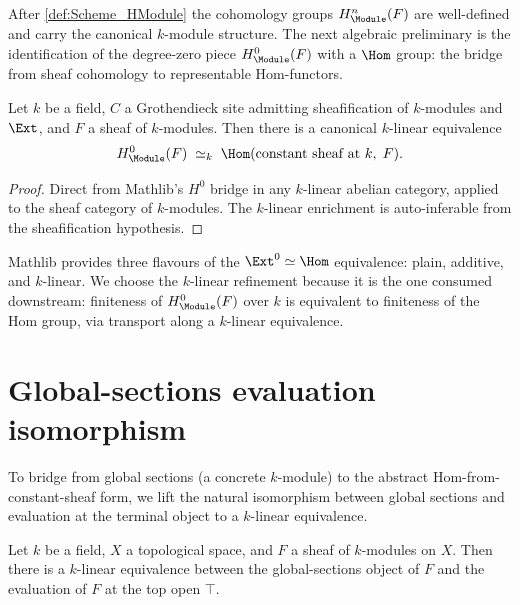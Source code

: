 After \cref{def:Scheme_HModule} the cohomology groups \(H^n_{\Module}(F)\) are well-defined and carry the canonical \(k\)-module structure. The next algebraic preliminary is the identification of the degree-zero piece \(H^0_{\Module}(F)\) with a \(\Hom\) group: the bridge from sheaf cohomology to representable Hom-functors.

\begin{definition}
  \label{def:Scheme_HModule_zero_linearEquiv}

  Let \(k\) be a field, \(C\) a Grothendieck site admitting sheafification of \(k\)-modules and \(\Ext\), and \(F\) a sheaf of \(k\)-modules. Then there is a canonical \(k\)-linear equivalence
  \[
    H^0_{\Module}(F) \;\simeq_k\; \Hom(\text{constant sheaf at }k,\; F).
  \]
\end{definition}

\begin{proof}
  
  \leanok
  Direct from Mathlib's \(H^0\) bridge in any \(k\)-linear abelian category, applied to the sheaf category of \(k\)-modules. The \(k\)-linear enrichment is auto-inferable from the sheafification hypothesis.
\end{proof}

\begin{remark}
  Mathlib provides three flavours of the \(\Ext^0 \simeq \Hom\) equivalence: plain, additive, and \(k\)-linear. We choose the \(k\)-linear refinement because it is the one consumed downstream: finiteness of \(H^0_{\Module}(F)\) over \(k\) is equivalent to finiteness of the Hom group, via transport along a \(k\)-linear equivalence.
\end{remark}

\section{Global-sections evaluation isomorphism}
\label{sec:gammaObj_linearEquiv_top}

To bridge from global sections (a concrete \(k\)-module) to the abstract Hom-from-constant-sheaf form, we lift the natural isomorphism between global sections and evaluation at the terminal object to a \(k\)-linear equivalence.

\begin{theorem}
  \label{thm:Scheme_SheafGammaObj_linearEquiv_top}
  
  Let \(k\) be a field, \(X\) a topological space, and \(F\) a sheaf of \(k\)-modules on \(X\). Then there is a \(k\)-linear equivalence between the global-sections object of \(F\) and the evaluation of \(F\) at the top open \(\top\).
\end{theorem}

